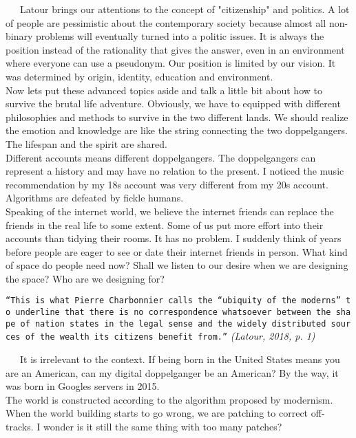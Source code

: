 \documentclass[
]{article}
\begin{document}
~~~Latour brings our attentions to the concept of "citizenship" and
politics. A lot of people are pessimistic about the contemporary society
because almost all non-binary problems will eventually turned into a
politic issues. It is always the position instead of the rationality
that gives the answer, even in an environment where everyone can use a
pseudonym. Our position is limited by our vision. It was determined by
origin, identity, education and environment.\\
Now let\textquotesingle s put these advanced topics aside and talk a
little bit about how to survive the brutal life adventure. Obviously, we
have to equipped with different philosophies and methods to survive in
the two different lands. We should realize the emotion and knowledge are
like the string connecting the two doppelgangers. The lifespan and the
spirit are shared.\\
Different accounts means different doppelgangers. The doppelgangers can
represent a history and may have no relation to the present. I noticed
the music recommendation by my 18\textquotesingle s account was very
different from my 20\textquotesingle s account. Algorithms are defeated
by fickle humans.\\
Speaking of the internet world, we believe the internet friends can
replace the friends in the real life to some extent. Some of us put more
effort into their accounts than tidying their rooms. It has no problem.
I suddenly think of years before people are eager to see or date their
internet friends in person. What kind of space do people need now? Shall
we listen to our desire when we are designing the space? Who are we
designing for?

\texttt{“This\ is\ what\ Pierre\ Charbonnier\ calls\ the\ “ubiquity\ of\ the\ moderns”\ to\ underline\ that\ there\ is\ no\ correspondence\ whatsoever\ between\ the\ shape\ of\ nation\ states\ in\ the\ legal\ sense\ and\ the\ widely\ distributed\ sources\ of\ the\ wealth\ its\ citizens\ benefit\ from.”}
\emph{(Latour, 2018, p. 1)}

~~~It is irrelevant to the context. If being born in the United States
means you are an American, can my digital doppelganger be an American?
By the way, it was born in Google\textquotesingle s servers in 2015.\\
The world is constructed according to the algorithm proposed by
modernism. When the world building starts to go wrong, we are patching
to correct off-tracks. I wonder is it still the same thing with too many
patches?
\end{document}
